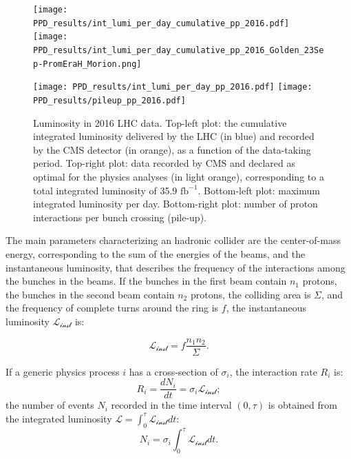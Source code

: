 \begin{figure}[!htb]
  \centering
    \texttt{[image: PPD\_results/int\_lumi\_per\_day\_cumulative\_pp\_2016.pdf]}%
    \texttt{[image: PPD\_results/int\_lumi\_per\_day\_cumulative\_pp\_2016\_Golden\_23Sep-PromEraH\_Morion.png]}

    \texttt{[image: PPD\_results/int\_lumi\_per\_day\_pp\_2016.pdf]}%
    \texttt{[image: PPD\_results/pileup\_pp\_2016.pdf]}

  \caption{Luminosity in 2016 LHC data. Top-left plot: the cumulative integrated luminosity delivered by the LHC (in blue) and recorded by the CMS detector (in orange), as a function of the data-taking period. Top-right plot: data recorded by CMS and declared as optimal for the physics analyses (in light orange), corresponding to a total integrated luminosity of 35.9 $\text{fb}^{-1}$. Bottom-left plot: maximum integrated luminosity per day. Bottom-right plot: number of proton interactions per bunch crossing (pile-up).}
  \label{fig:LHC_lumi}
\end{figure}

\noindent The main parameters characterizing an hadronic collider are the center-of-mass energy, corresponding to the sum of the energies of the beams, and the instantaneous luminosity, that describes the frequency of the interactions among the bunches in the beams. If the bunches in the first beam contain $n_1$ protons, the bunches in the second beam contain $n_2$ protons, the colliding area is $\Sigma$, and the frequency of complete turns
around the ring is $f$, the instantaneous luminosity $\mathcal{L_{\text{inst}}}$ is:

\begin{equation}
\mathcal{L_{\text{inst}}} = f \frac{n_1 n_2}{\Sigma}.
\label{eq:LHC_luminosity_def}
\end{equation}

\noindent If a generic physics process $i$ has a cross-section of $\sigma_i$, the interaction rate $R_i$ is:
\begin{equation}
R_i = \frac{dN_i}{dt}= \sigma_i \mathcal{L_{\text{inst}}};
\label{eq:LHC_interaction_rate}
\end{equation}
the number of events $N_i$ recorded in the time interval $(0,\tau)$ is obtained from the integrated luminosity $\mathcal{L} = \int_0^{\tau} \mathcal{L_{\text{inst}}} dt$:
\begin{equation}
N_i = \sigma_i \int_0^{\tau} \mathcal{L_{\text{inst}}} dt.
\end{equation}


